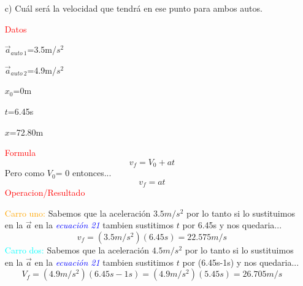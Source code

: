 \documentclass[letterpaper,12pt]{article}
\begin{document}
\begin{enumerate}
\begin {itemize}
     {\textcolor{orange}{Carro uno:}} Sabemos que la aceleración $3.5m/s^{2}$ por lo tanto si lo sustituimos en la $\Vec{a}$ en la {\textcolor{blue}{\textit{ecuación 17}}} tambien sustitimos $t$ por 6.45s y nos quedaria... 
    \begin{equation}
      x=\frac{3.5m/s}{2}^{2}(6.45s)^{2}=\frac{3.5m/s}{2}^{2}\left(\frac{16641}{400}s^{2}\right)=72.80m 
      \end{equation}
     {\textcolor{cyan}{Carro dos:}} Sabemos que la aceleración $4.5m/s^{2}$ por lo tanto si lo sustituimos en la $\Vec{a}$ en la {\textcolor{blue}{\textit{ecuación 17}}} tambien sustitimos $t$ por (6.45s-1s) y nos quedaria... 
     \begin{equation}
      x=\frac{4.9m/s}{2}^{2}(6.45s-1s)^{2}=\frac{4.9m/s}{2}^{2}(5.45s)^{2}=\frac{4.9m/s}{2}^{2}\left(\frac{11881}{400}s^{2}\right)=72.77m
      \end{equation}
    Por lo tanto si igualamos la {\textcolor{blue}{\textit{ecuación 18}}} y {\textcolor{blue}{\textit{ecuación 19}}} nos daria...
    
    $$72.80m=72.77m \Rightarrow x \approx 72.80m$$
    
    $\therefore$ Cuando el auto dos alcanza al primer carro estara a una distancia de  72.80 m aproximadamente.
     
    \item[c)] Cuál será la velocidad que tendrá en ese punto para ambos autos.
    
    {\textcolor{red}{Datos}}
    
    $\Vec{a}_{auto \ 1}$=3.5m/$s^{2}$
    
    $\Vec{a}_{auto \ 2}$=4.9m/$s^{2}$
    
    $x_{0}$=0m
    
    $t$=6.45s
    
    $x$=72.80m
    
     {\textcolor{red}{Formula}}
      \begin{equation}
      v_f=V_0+at
      \end{equation}
      Pero como $V_0$= 0 entonces...
      \begin{equation}
      v_f=at
      \end{equation}
      {\textcolor{red}{Operacion/Resultado}}
       
       {\textcolor{orange}{Carro uno:}} Sabemos que la aceleración $3.5m/s^{2}$ por lo tanto si lo sustituimos en la $\Vec{a}$ en la {\textcolor{blue}{\textit{ecuación 21}}} tambien sustitimos $t$ por 6.45s y nos quedaria... 
    \begin{equation}
       v_f=(3.5m/s^{2})(6.45s)=22.575m/s
      \end{equation}
     {\textcolor{cyan}{Carro dos:}} Sabemos que la aceleración $4.5m/s^{2}$ por lo tanto si lo sustituimos en la $\Vec{a}$ en la {\textcolor{blue}{\textit{ecuación 21}}} tambien sustitimos $t$ por (6.45s-1s) y nos quedaria... 
     \begin{equation}
      V_f=(4.9m/s^{2})(6.45s-1s)=(4.9m/s^{2})(5.45s)=26.705m/s
      \end{equation}
    

\end{itemize}
\end{enumerate}
\end{document}
